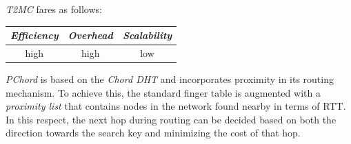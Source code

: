 %
\emph{T2MC} fares as follows:
\begin{center}
{\footnotesize
\begin{tabular}{ccc}
\emph{Efficiency} & \emph{Overhead} & \emph{Scalability} \\
\hline
high &
high &
low
\end{tabular}
}
\end{center}

\emph{PChord} \cite{HLYW2005} is based on the \emph{Chord DHT} and incorporates
proximity in its routing mechanism. 
To achieve this, the standard finger table
is augmented with a \emph{proximity list} that contains
nodes in the network found nearby in terms of RTT.
In this respect, the next hop during routing can be decided based on both the
direction towards the search key and minimizing the cost of that hop.

